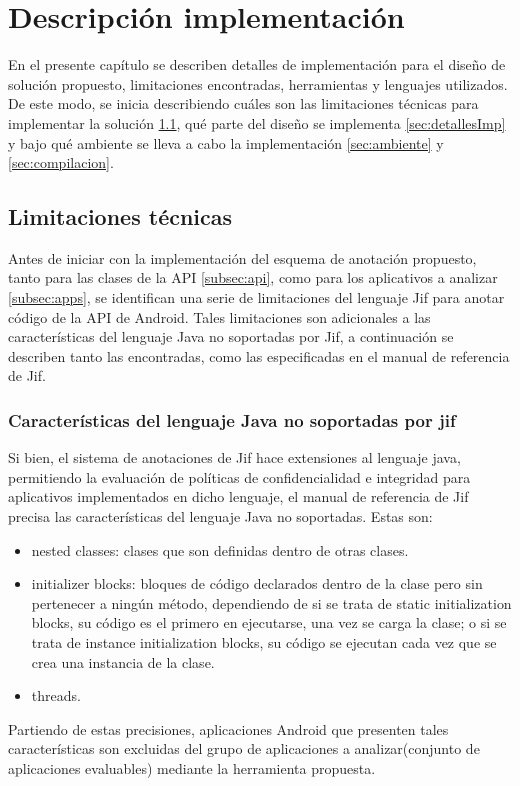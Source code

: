 \chapter{Descripción implementación}
En el presente capítulo se describen detalles de implementación para el diseño
de solución propuesto, limitaciones encontradas, herramientas y lenguajes
utilizados. De este modo, se inicia describiendo cuáles son las limitaciones
técnicas para implementar la solución \ref{sec:limitaciones-tec}, qué parte del
diseño se implementa \ref{sec:detallesImp} y bajo qué ambiente se lleva a cabo
la implementación \ref{sec:ambiente} y \ref{sec:compilacion}.

\section{Limitaciones técnicas}
\label{sec:limitaciones-tec}
Antes de iniciar con la implementación del esquema de anotación propuesto, tanto
para las clases de la API \ref{subsec:api}, como para los aplicativos a analizar
\ref{subsec:apps}, se identifican una serie de limitaciones del lenguaje
Jif para anotar código de la API de Android. 
Tales limitaciones son adicionales a las características del lenguaje Java no
soportadas por Jif, a continuación se describen tanto las encontradas, como las
especificadas en el manual de referencia de Jif.

\subsection{Características del lenguaje Java no soportadas por jif}
Si bien, el sistema de anotaciones de Jif hace extensiones al lenguaje java,
permitiendo la evaluación de políticas de confidencialidad e integridad para
aplicativos implementados en dicho lenguaje, el manual de referencia de Jif
precisa las características del lenguaje Java no soportadas\cite{jifRef}. Estas
son:
\begin{itemize}
  \item nested classes: clases que son definidas dentro de otras clases.
  \item initializer blocks: bloques de código declarados dentro de la clase pero
  sin pertenecer a ningún método, dependiendo de si se trata de static
  initialization blocks, su código es el primero en ejecutarse, una vez se
  carga la clase; o si se trata de instance initialization blocks, su código se
  ejecutan cada vez que se crea una instancia de la clase.
\item threads.
\end{itemize} 
Partiendo de estas precisiones, aplicaciones Android que presenten tales
características son excluidas del grupo de aplicaciones a analizar(conjunto de
aplicaciones evaluables) mediante la herramienta propuesta.

